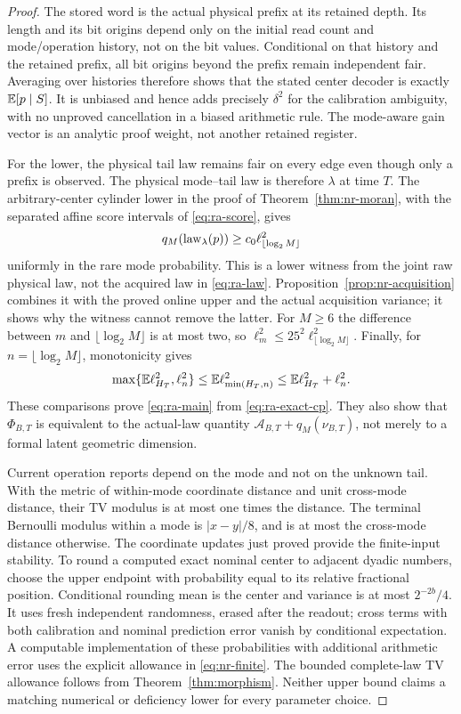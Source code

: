\begin{proof}
The stored word is the actual physical prefix at its retained depth. Its length and its bit origins depend only on the initial read count and mode/operation history, not on the bit values. Conditional on that history and the retained prefix, all bit origins beyond the prefix remain independent fair. Averaging over histories therefore shows that the stated center decoder is exactly $\mathbb E[p\mid S]$. It is unbiased and hence adds precisely $\delta^2$ for the calibration ambiguity, with no unproved cancellation in a biased arithmetic rule. The mode-aware gain vector is an analytic proof weight, not another retained register.

For the lower, the physical tail law remains fair on every edge even though only a prefix is observed. The physical mode--tail law is therefore $\lambda$ at time $T$. The arbitrary-center cylinder lower in the proof of Theorem~\ref{thm:nr-moran}, with the separated affine score intervals of \eqref{eq:ra-score}, gives
\[
 q_M(\operatorname{law}_\lambda(p))\ge c_0\ell_{\lfloor\log_2M\rfloor}^2
\]
uniformly in the rare mode probability. This is a lower witness from the joint raw physical law, not the acquired law in \eqref{eq:ra-law}. Proposition~\ref{prop:nr-acquisition} combines it with the proved online upper and the actual acquisition variance; it shows why the witness cannot remove the latter. For $M\ge6$ the difference between $m$ and $\lfloor\log_2M\rfloor$ is at most two, so $\ell_m^2\le25^2\ell_{\lfloor\log_2M\rfloor}^2$. Finally, for $n=\lfloor\log_2M\rfloor$, monotonicity gives
\[
 \max\{\mathbb E\ell_{H_T}^2,\ell_n^2\}
 \le\mathbb E\ell_{\min(H_T,n)}^2
 \le\mathbb E\ell_{H_T}^2+\ell_n^2.
\]
These comparisons prove \eqref{eq:ra-main} from \eqref{eq:ra-exact-cp}. They also show that $\Phi_{B,T}$ is equivalent to the actual-law quantity $\mathcal A_{B,T}+q_M(\nu_{B,T})$, not merely to a formal latent geometric dimension.

Current operation reports depend on the mode and not on the unknown tail. With the metric of within-mode coordinate distance and unit cross-mode distance, their TV modulus is at most one times the distance. The terminal Bernoulli modulus within a mode is $|x-y|/8$, and is at most the cross-mode distance otherwise. The coordinate updates just proved provide the finite-input stability. To round a computed exact nominal center to adjacent dyadic numbers, choose the upper endpoint with probability equal to its relative fractional position. Conditional rounding mean is the center and variance is at most $2^{-2b}/4$. It uses fresh independent randomness, erased after the readout; cross terms with both calibration and nominal prediction error vanish by conditional expectation. A computable implementation of these probabilities with additional arithmetic error uses the explicit allowance in \eqref{eq:nr-finite}. The bounded complete-law TV allowance follows from Theorem~\ref{thm:morphism}. Neither upper bound claims a matching numerical or deficiency lower for every parameter choice.
\end{proof}

